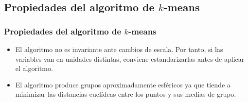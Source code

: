 \subsection{Propiedades del algoritmo de $k$-means}
\begin{frame}
\frametitle{Propiedades del algoritmo de $k$-means}
\begin{itemize}
\item<2->{El algoritmo no es invariante ante cambios de escala. Por tanto, si las variables van en unidades distintas, conviene estandarizarlas antes de aplicar el algoritmo.}
\item<3->{El algoritmo produce grupos aproximadamente esféricos ya que tiende a minimizar las distancias euclídeas entre los puntos y sus medias de grupo.}
\end{itemize}
\end{frame}

